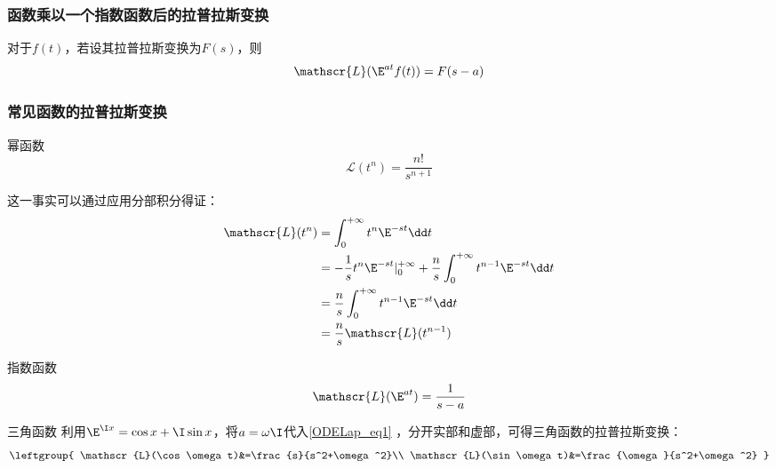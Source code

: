 \subsubsection{函数乘以一个指数函数后的拉普拉斯变换}




\begin{theorem}{}\label{ODELap_the2}
对于$f(t)$，若设其拉普拉斯变换为$F(s)$，则
\begin{equation}
\mathscr{L}(\E^{at}f(t))=F(s-a)
\end{equation}
\end{theorem}









\subsubsection{常见函数的拉普拉斯变换}

\begin{example}{幂函数}
\begin{equation}
\mathscr{L}(t^n)=\frac{n!}{s^{n+1}}
\end{equation}

这一事实可以通过应用分部积分得证：
\begin{equation}\label{ODELap_eq2}
\begin{aligned}
\mathscr{L}(t^n)&=\int_0^{+\infty}t^n\E^{-st}\dd t\\
&=-\frac{1}{s}t^n\E^{-st}|^{+\infty}_0+\frac{n}{s}\int_0^{+\infty}t^{n-1}\E^{-st}\dd t\\
&=\frac{n}{s}\int_0^{+\infty}t^{n-1}\E^{-st}\dd t\\
&=\frac{n}{s}\mathscr{L}(t^{n-1})
\end{aligned}
\end{equation}
\end{example}

\begin{example}{指数函数}
\begin{equation}\label{ODELap_eq1}
\mathscr{L}(\E^{at})=\frac{1}{s-a}
\end{equation}

\end{example}

\begin{example}{三角函数}
利用$\E^{\I x}=\cos x+\I\sin x$，将$a=\omega\I$代入\autoref{ODELap_eq1} ，分开实部和虚部，可得三角函数的拉普拉斯变换：
\begin{equation}\label{ODELap_eq3}
\leftgroup{
    \mathscr{L}(\cos \omega t)&=\frac{s}{s^2+\omega^2}\\
    \mathscr{L}(\sin \omega t)&=\frac{\omega}{s^2+\omega^2}
}
\end{equation}
\end{example}


